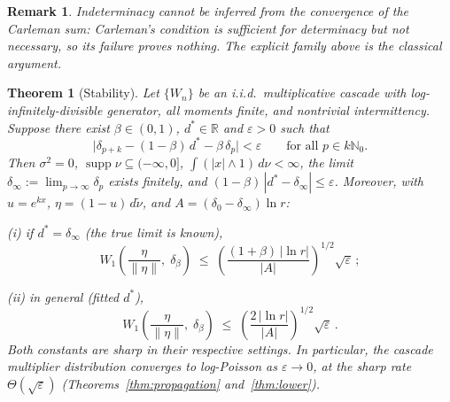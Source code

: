 \documentclass[pdflatex,sn-mathphys-num]{sn-jnl}
\theoremstyle{thmstyleone}
\newtheorem{theorem}{Theorem}
\theoremstyle{thmstyletwo}
\newtheorem*{remark}{Remark}
\theoremstyle{thmstylethree}
\DeclareMathOperator{\supp}{supp}
\begin{document}
\begin{remark}
Indeterminacy cannot be inferred from the convergence of the
Carleman sum: Carleman's condition is sufficient for determinacy but
not necessary, so its failure proves nothing.  The explicit family
above is the classical argument.
\end{remark}


\begin{theorem}[Stability]\label{thm:stability}
Let $\{W_n\}$ be an i.i.d.\ multiplicative cascade with
log-infinitely-divisible generator, all moments finite, and
nontrivial intermittency.  Suppose there exist $\beta \in (0,1)$,
$d^* \in \mathbb{R}$ and $\varepsilon > 0$ such that
\[
  \bigl|\delta_{p+k} - (1-\beta)\,d^* - \beta\,\delta_p\bigr|
  < \varepsilon
  \qquad\text{for all } p \in k\mathbb{N}_0 .
\]
Then $\sigma^2 = 0$, $\supp\nu \subseteq (-\infty,0]$,
$\int(|x|\wedge1)\,d\nu < \infty$, the limit $\delta_\infty :=
\lim_{p\to\infty}\delta_p$ exists finitely, and
$(1-\beta)\,|d^* - \delta_\infty| \le \varepsilon$.  Moreover, with
$u = e^{kx}$, $\eta = (1-u)\,d\tilde\nu$, and
$A = (\delta_0 - \delta_\infty)\ln r$:

\textup{(i)} if $d^* = \delta_\infty$ (the true limit is known),
\[
  W_1\!\left(\frac{\eta}{\|\eta\|},\;\delta_\beta\right)
  \;\leq\;
  \left(\frac{(1+\beta)\,|\ln r|}{|A|}\right)^{\!1/2}
  \!\sqrt{\varepsilon}\,;
\]

\textup{(ii)} in general (fitted $d^*$),
\[
  W_1\!\left(\frac{\eta}{\|\eta\|},\;\delta_\beta\right)
  \;\leq\;
  \left(\frac{2\,|\ln r|}{|A|}\right)^{\!1/2}
  \!\sqrt{\varepsilon}\,.
\]
Both constants are sharp in their respective settings.  In
particular, the cascade multiplier distribution converges to
log-Poisson as $\varepsilon \to 0$, at the sharp rate
$\Theta(\sqrt\varepsilon)$
(Theorems~\ref{thm:propagation} and~\ref{thm:lower}).
\end{theorem}
\end{document}
